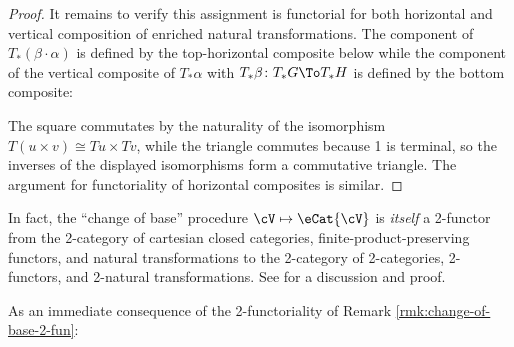 \begin{proof}
It remains to verify this assignment is functorial for both horizontal and vertical composition of enriched natural transformations. %
The component of $T_*(\beta\cdot\alpha)$ is defined by the top-horizontal composite below while the component of the vertical composite of $T_*\alpha$ with $T_*\beta \colon T_*G \To T_*H$ is defined by the bottom composite: \begin{center}
\end{center}
The square commutates by the naturality of the isomorphism $T(u \times v) \cong Tu \times Tv$, while the triangle commutes because 1 is terminal, so the inverses of the displayed isomorphisms form a commutative triangle. The argument for functoriality of horizontal composites is similar.
\end{proof}


\begin{rmk}\label{rmk:change-of-base-2-fun} In fact, the ``change of base'' procedure $\cV \mapsto \eCat{\cV}$ is \emph{itself} a 2-functor from the 2-category of cartesian closed categories, finite-product-preserving functors, and natural transformations to the 2-category of 2-cat\-e\-go\-ries, 2-functors, and 2-natural transformations. See \cite[\S 4.3]{Cruttwell:2008rr} for a discussion and proof.
\end{rmk}


As an immediate consequence of the 2-functoriality of Remark \ref{rmk:change-of-base-2-fun}:

